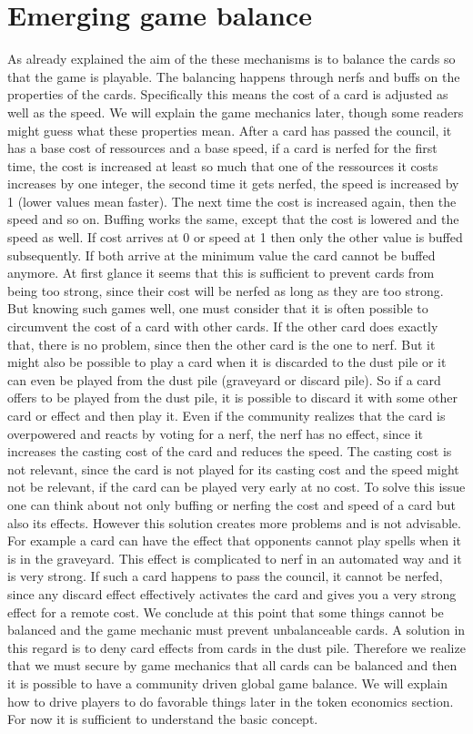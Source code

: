 \documentclass{article}
\begin{document}
\section{Emerging game balance}
%
As already explained the aim of the these mechanisms is to balance the cards so that the game is playable. The balancing happens through nerfs and buffs on the properties of the cards. Specifically this means the cost of a card is adjusted as well as the speed. We will explain the game mechanics later, though some readers might guess what these properties mean. After a card has passed the council, it has a base cost of ressources and a base speed, if a card is nerfed for the first time, the cost is increased at least so much that one of the ressources it costs increases by one integer, the second time it gets nerfed, the speed is increased by 1 (lower values mean faster). The next time the cost is increased again, then the speed and so on. Buffing works the same, except that the cost is lowered and the speed as well. If cost arrives at 0 or speed at 1 then only the other value is buffed subsequently. If both arrive at the minimum value the card cannot be buffed anymore. At first glance it seems that this is sufficient to prevent cards from being too strong, since their cost will be nerfed as long as they are too strong. But knowing such games well, one must consider that it is often possible to circumvent the cost of a card with other cards. If the other card does exactly that, there is no problem, since then the other card is the one to nerf. But it might also be possible to play a card when it is discarded to the dust pile or it can even be played from the dust pile (graveyard or discard pile). So if a card offers to be played from the dust pile, it is possible to discard it with some other card or effect and then play it. Even if the community realizes that the card is overpowered and reacts by voting for a nerf, the nerf has no effect, since it increases the casting cost of the card and reduces the speed. The casting cost is not relevant, since the card is not played for its casting cost and the speed might not be relevant, if the card can be played very early at no cost. To solve this issue one can think about not only buffing or nerfing the cost and speed of a card but also its effects. However this solution creates more problems and is not advisable. For example a card can have the effect that opponents cannot play spells when it is in the graveyard. This effect is complicated to nerf in an automated way and it is very strong. If such a card happens to pass the council, it cannot be nerfed, since any discard effect effectively activates the card and gives you a very strong effect for a remote cost. We conclude at this point that some things cannot be balanced and the game mechanic must prevent unbalanceable cards. A solution in this regard is to deny card effects from cards in the dust pile. \newline
Therefore we realize that we must secure by game mechanics that all cards can be balanced and then it is possible to have a community driven global game balance. We will explain how to drive players to do favorable things later in the token economics section. For now it is sufficient to understand the basic concept.
%
\end{document}
